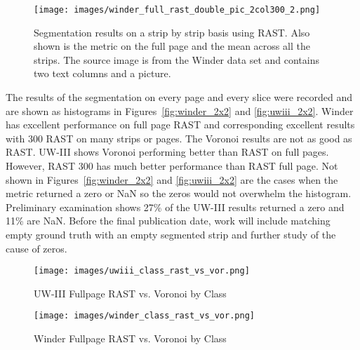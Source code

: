 \documentclass[conference]{IEEEtran}
\begin{document}
\begin{figure}[t]
\begin{center}
\texttt{[image: images/winder\_full\_rast\_double\_pic\_2col300\_2.png]}
\end{center}
\caption{Segmentation results on a strip by strip basis using RAST. 
Also shown is the metric on the full page and the mean across all the strips.
The source image
is from the Winder data set and contains two text columns and a picture.}
\label{fig:winder-300-double-pic-2col300}
\end{figure}

The results of the segmentation on every page and every slice were recorded 
and are shown as histograms in 
Figures~\ref{fig:winder_2x2} and \ref{fig:uwiii_2x2}. 
Winder has excellent performance on full page RAST and corresponding excellent
results with 300 RAST on many strips or pages.  The Voronoi results are not as
good as RAST. UW-III shows Voronoi performing better than RAST on full pages.
However, RAST 300 has much better performance than RAST full page.
Not shown in Figures~\ref{fig:winder_2x2} and \ref{fig:uwiii_2x2} are the cases
when the metric returned a zero or NaN so the zeros would not overwhelm the
histogram. 
Preliminary examination shows 27\% of the
UW-III results returned a zero and 11\% are NaN. 
Before the final publication date, work will include matching empty ground
truth with an empty segmented strip and further study of the cause of zeros. 


\begin{figure}[uwiii-class-rast-vs-vor]
\begin{center}
\texttt{[image: images/uwiii\_class\_rast\_vs\_vor.png]}
\end{center}
\caption{UW-III Fullpage RAST vs. Voronoi by Class}
\label{fig:uwiii-class-rast-vs-vor}
\end{figure}

\begin{figure}[winder-class-rast-vs-vor]
\begin{center}
\texttt{[image: images/winder\_class\_rast\_vs\_vor.png]}
\end{center}
\caption{Winder Fullpage RAST vs. Voronoi by Class}
\label{fig:winder-class-rast-vs-vor}
\end{figure}
\end{document}
